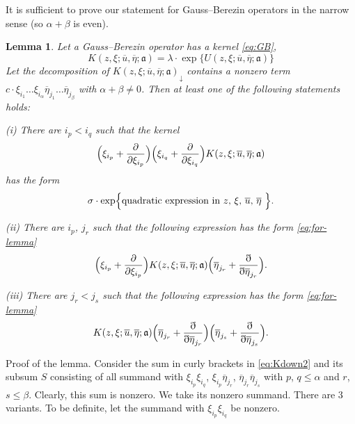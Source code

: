 \documentclass[]{amsart}
\newtheorem{lemma}[theorem]{Lemma}
\def\le{\leqslant}
\def\fra{\mathfrak a}
\def\ov{\overline}
\def\sm{\smallskip}
\begin{document}
It is sufficient to prove our statement for Gauss--Berezin operators
in the narrow sense (so $\alpha+\beta$ is even).
\begin{lemma}
Let a Gauss--Berezin operator has a kernel \eqref{eq:GB},
\begin{equation}
K(z,\xi;\ov u,\ov\eta;\fra)=\lambda\cdot 
\exp\bigl\{U(z,\xi;\ov u,\ov\eta;\fra)\bigr\}
\label{eq:K-U}
\end{equation}
Let the decomposition of $K(z,\xi;\ov u,\ov\eta;\fra)_\downarrow$
contains a nonzero term 	$c\cdot
	\xi_{i_1}\dots \xi_{i_\alpha} \ov\eta_{j_1} \dots \ov\eta_{j_\beta}$
	with $\alpha+\beta\ne 0$.
	Then  at least one of the following statements holds:
	
\sm 	
	
{\rm (i)} There are $i_p<i_q$ such that
the kernel 
$$
\Bigl(\xi_{i_p}+\frac\partial{\partial \xi_{i_p}}\Bigr)
\Bigl(\xi_{i_q}+\frac\partial{\partial \xi_{i_q}}\Bigr)
K(z,\xi;\ov u,\ov\eta;\fra)
$$
has the form 
\begin{equation}
\sigma\cdot \exp\Bigl\{\text{\rm quadratic expression in $z$, $\xi$, $\ov u$,
$\ov\eta$ }
\Bigr\}.
\label{eq:for-lemma}
\end{equation}

{\rm (ii)} There are $i_p$, $j_r$ such that
the following expression has the form \eqref{eq:for-lemma}
$$
\Bigl(\xi_{i_p}+\frac\partial{\partial \xi_{i_p}}\Bigr)
K(z,\xi;\ov u,\ov\eta;\fra)
\Bigl(\ov\eta_{j_r}+\frac{\eth}{\eth \ov\eta_{j_r}} \Bigr)
.$$

{\rm (iii)} There are  $j_r<j_s$ such that
the following expression has the form \eqref{eq:for-lemma}
$$
K(z,\xi;\ov u,\ov\eta;\fra)
\Bigl(\ov\eta_{j_r}+\frac{\eth}{\eth \ov\eta_{j_r}} \Bigr)
\Bigl(\ov\eta_{j_s}+\frac{\eth}{\eth \ov\eta_{j_s}} \Bigr)
.$$
	\end{lemma}

{\sc Proof of the lemma.} Consider the sum  in curly brackets in
\eqref{eq:Kdown2} and its subsum $S$ consisting of 
all summand with $\xi_{i_p}\xi_{i_q}$, $\xi_{i_p}\ov \eta_{j_r}$,
$\ov \eta_{j_r} \ov \eta_{j_s}$ with $p$, $q\le\alpha$
and $r$, $s\le\beta$. Clearly, this sum is nonzero. We take its
nonzero summand. There are 3 variants. To be definite, let the 
summand with $\xi_{i_p}\xi_{i_q}$ be nonzero.
\end{document}
